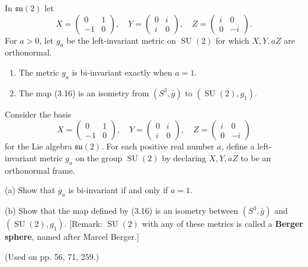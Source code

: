 \begin{proposition}
\label{prop:berger-sphere}
In $\mathfrak{su}(2)$ let
\[
X=\begin{pmatrix}0&1\\-1&0\end{pmatrix},\quad
Y=\begin{pmatrix}0&i\\i&0\end{pmatrix},\quad
Z=\begin{pmatrix}i&0\\0&-i\end{pmatrix}.
\]
For $a>0$, let $g_a$ be the left-invariant metric on $\operatorname{SU}(2)$ for
which $X,Y,aZ$ are orthonormal.
\begin{enumerate}
\item[(a)] The metric $g_a$ is bi-invariant exactly when $a=1$.
\item[(b)] The map (3.16) is an isometry from
$(S^3,\bar g)$ to $(\operatorname{SU}(2),g_1)$.
\end{enumerate}
\end{proposition}

\begin{exercise}
\label{prob:berger-sphere}
Consider the basis
\[
X = \begin{pmatrix} 0 & 1 \\ -1 & 0 \end{pmatrix}, \quad Y = \begin{pmatrix} 0 & i \\ i & 0 \end{pmatrix}, \quad Z = \begin{pmatrix} i & 0 \\ 0 & -i \end{pmatrix}
\]
for the Lie algebra $\mathfrak{su}(2)$. For each positive real number $a$, define a left-invariant metric $g_a$ on the group $\operatorname{SU}(2)$ by declaring $X, Y, aZ$ to be an orthonormal frame.

(a) Show that $g_a$ is bi-invariant if and only if $a = 1$.

(b) Show that the map defined by (3.16) is an isometry between $(S^3, \bar{g})$ and $(\operatorname{SU}(2), g_1)$. [Remark: $\operatorname{SU}(2)$ with any of these metrics is called a \textbf{Berger sphere}, named after Marcel Berger.]

(Used on pp. 56, 71, 259.)
\end{exercise}


